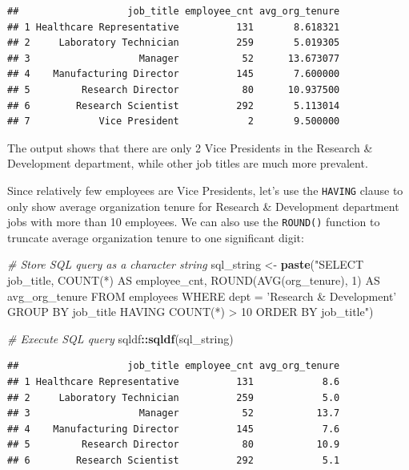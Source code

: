 \documentclass[]{book}
\newenvironment{Shaded}{\begin{snugshade}}{\end{snugshade}}
\newcommand{\CommentTok}[1]{\textcolor[rgb]{0.56,0.35,0.01}{\textit{#1}}}
\newcommand{\KeywordTok}[1]{\textcolor[rgb]{0.13,0.29,0.53}{\textbf{#1}}}
\newcommand{\NormalTok}[1]{#1}
\newcommand{\OperatorTok}[1]{\textcolor[rgb]{0.81,0.36,0.00}{\textbf{#1}}}
\newcommand{\StringTok}[1]{\textcolor[rgb]{0.31,0.60,0.02}{#1}}
\begin{document}
\begin{verbatim}
##                   job_title employee_cnt avg_org_tenure
## 1 Healthcare Representative          131       8.618321
## 2     Laboratory Technician          259       5.019305
## 3                   Manager           52      13.673077
## 4    Manufacturing Director          145       7.600000
## 5         Research Director           80      10.937500
## 6        Research Scientist          292       5.113014
## 7            Vice President            2       9.500000
\end{verbatim}

The output shows that there are only 2 Vice Presidents in the Research \& Development department, while other job titles are much more prevalent.

Since relatively few employees are Vice Presidents, let's use the \texttt{HAVING} clause to only show average organization tenure for Research \& Development department jobs with more than 10 employees. We can also use the \texttt{ROUND()} function to truncate average organization tenure to one significant digit:

\begin{Shaded}
\begin{Highlighting}[]
\CommentTok{# Store SQL query as a character string}
\NormalTok{sql_string <-}\StringTok{ }\KeywordTok{paste}\NormalTok{(}\StringTok{"SELECT}
\StringTok{                      job_title,}
\StringTok{                      COUNT(*) AS employee_cnt,}
\StringTok{                      ROUND(AVG(org_tenure), 1) AS avg_org_tenure}
\StringTok{                    FROM}
\StringTok{                      employees}
\StringTok{                    WHERE}
\StringTok{                      dept = 'Research & Development'}
\StringTok{                    GROUP BY}
\StringTok{                      job_title}
\StringTok{                    HAVING}
\StringTok{                      COUNT(*) > 10}
\StringTok{                    ORDER BY}
\StringTok{                      job_title"}\NormalTok{)}

\CommentTok{# Execute SQL query}
\NormalTok{sqldf}\OperatorTok{::}\KeywordTok{sqldf}\NormalTok{(sql_string)}
\end{Highlighting}
\end{Shaded}

\begin{verbatim}
##                   job_title employee_cnt avg_org_tenure
## 1 Healthcare Representative          131            8.6
## 2     Laboratory Technician          259            5.0
## 3                   Manager           52           13.7
## 4    Manufacturing Director          145            7.6
## 5         Research Director           80           10.9
## 6        Research Scientist          292            5.1
\end{verbatim}
\end{document}
